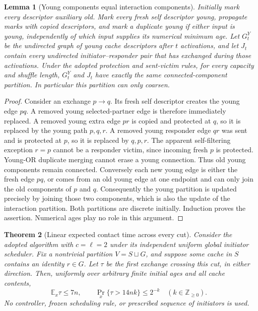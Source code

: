 \documentclass[11pt]{article}
\newtheorem{theorem}{Theorem}
\newtheorem{lemma}[theorem]{Lemma}
\begin{document}
\begin{lemma}[Young components equal interaction components]
\label{lem:younginteractioncomponents}
Initially mark every descriptor auxiliary old. Mark every fresh
self descriptor young, propagate marks with copied descriptors,
and mark a duplicate young if either input is young, independently
of which input supplies its numerical minimum age.
Let $G_t^Y$ be the undirected graph of young cache descriptors
after $t$ activations, and let $J_t$ contain every undirected
initiator--responder pair that has exchanged during those activations.
Under the adopted protection and sent-victim rules, for every
capacity and shuffle length, $G_t^Y$ and $J_t$ have exactly the
same connected-component partition. In particular this partition
can only coarsen.
\end{lemma}
\begin{proof}
Consider an exchange $p\to q$. Its fresh self descriptor creates
the young edge $pq$. A removed young selected-partner edge is
therefore immediately replaced. A removed young extra edge $pr$
is copied and protected at $q$, so it is replaced by the young
path $p,q,r$. A removed young responder edge $qr$ was sent and
is protected at $p$, so it is replaced by $q,p,r$.
The apparent self-filtering exception $r=p$ cannot be a responder
victim, since incoming fresh $p$ is protected. Young-OR duplicate
merging cannot erase a young connection. Thus old young components
remain connected. Conversely each new young edge is either the
fresh edge $pq$, or comes from an old young edge at one endpoint
and can only join the old components of $p$ and $q$.
Consequently the young partition is updated precisely by joining
those two components, which is also the update of the interaction
partition. Both partitions are discrete initially. Induction proves
the assertion. Numerical ages play no role in this argument.
\end{proof}

\begin{theorem}[Linear expected contact time across every cut]
\label{thm:c2readycontact}
Consider the adopted algorithm with $c=\ell=2$ under its
independent uniform global initiator scheduler. Fix a
nontrivial partition $V=S\sqcup G$, and suppose some
cache in $S$ contains an identity $r\in G$.
Let $\tau$ be the first exchange crossing this cut,
in either direction. Then, uniformly over arbitrary
finite initial ages and all cache contents,
\[
 \mathbb E_x\tau\le7n,\qquad
 \Pr_x\{\tau>14nk\}\le2^{-k}\quad(k\in\mathbb Z_{\ge0}).
\]
No controller, frozen scheduling rule, or prescribed
sequence of initiators is used.
\end{theorem}
\end{document}
